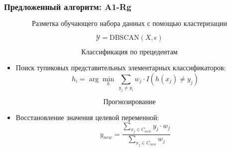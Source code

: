 \documentclass[10pt,pdf,unicode,aspectratio=169]{beamer}
\begin{document}
\begin{frame}
\frametitle{Предложенный алгоритм: A1-Rg}
  
  \[\textbf{Разметка обучающего набора данных с помощью кластеризации} \]
  \begin{itemize}
      \begin{equation}
        \mathcal{Y} = \text{DBSCAN}(X, \epsilon)
      \end{equation}
  \end{itemize}
  \[\textbf{Классификация по прецедентам}\]
  \begin{itemize}
    \item Поиск тупиковых представительных элементарных классификаторов:
      \begin{equation}
        h_i = \arg\min_h\ \sum_{y_j \neq y_i} w_j \cdot I(h(x_j) \neq y_j)
      \end{equation}
  \end{itemize}
  \[\textbf{Прогнозирование}\]
  \begin{itemize}
    \item Восстановление значения целевой переменной:
      \begin{equation}
        y_{new} = \frac{\sum_{x_j \in C_{new}} y_j \cdot w_j}{\sum_{x_j \in C_{new}} w_j}
      \end{equation}
  \end{itemize}
\end{frame}
\end{document}
